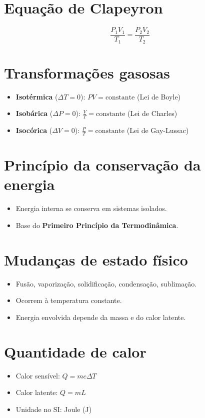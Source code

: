 \documentclass[a4paper,12pt]{article}
\begin{document}
\begin{multicols}{2}
\section{Equação de Clapeyron}
\begin{equation}
    \frac{P_1V_1}{T_1} = \frac{P_2V_2}{T_2}
\end{equation}

\section{Transformações gasosas}
\begin{itemize}
    \item \textbf{Isotérmica} ($\Delta T = 0$): $PV = \text{constante}$ \hfill (Lei de Boyle)
    \item \textbf{Isobárica} ($\Delta P = 0$): $\frac{V}{T} = \text{constante}$ \hfill (Lei de Charles)
    \item \textbf{Isocórica} ($\Delta V = 0$): $\frac{P}{T} = \text{constante}$ \hfill (Lei de Gay-Lussac)
\end{itemize}

\section{Princípio da conservação da energia}
\begin{itemize}
    \item Energia interna se conserva em sistemas isolados.
    \item Base do \textbf{Primeiro Princípio da Termodinâmica}.
\end{itemize}

\section{Mudanças de estado físico}
\begin{itemize}
    \item Fusão, vaporização, solidificação, condensação, sublimação.
    \item Ocorrem à temperatura constante.
    \item Energia envolvida depende da massa e do calor latente.
\end{itemize}

\section{Quantidade de calor}
\begin{itemize}
    \item Calor sensível: $Q = mc\Delta T$
    \item Calor latente: $Q = mL$
    \item Unidade no SI: Joule (J)
\end{itemize}


\end{multicols}
\end{document}
